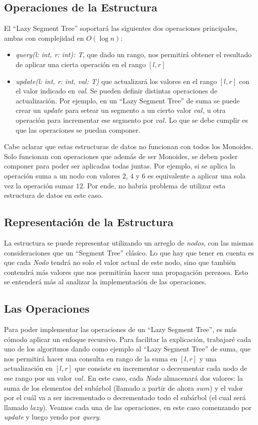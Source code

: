 \documentclass{article}
\begin{document}
\subsection{Operaciones de la Estructura}

El ``Lazy Segment Tree'' soportará las siguientes dos operaciones principales, ambas con complejidad en $O(\log n)$:
\begin{itemize}
    \item \textit{query(l: int, r: int): T}, que dado un rango, nos permitirá obtener el resultado de aplicar una cierta operación en el rango $[l,r]$
    \item  \textit{update(l: int, r: int, val: T)} que actualizará los valores en el rango $[l,r]$ con el valor indicado en \textit{val}. Se pueden definir distintas operaciones de actualización. Por ejemplo, en un ``Lazy Segment Tree'' de suma se puede crear un \textit{update} para setear un segmento a un cierto valor $val$, u otra operación para incrementar ese segmento por $val$. Lo que se debe cumplir es que las operaciones se puedan componer.
\end{itemize}

Cabe aclarar que estas estructuras de datos no funcionan con todos los Monoides. Solo funcionan con operaciones que además de ser Monoides, se deben poder componer para poder ser aplicadas todas juntas. Por ejemplo, si se aplica la operación suma a un nodo con valores $2$, $4$ y $6$ es equivalente a aplicar una sola vez la operación sumar $12$. Por ende, no habría problema de utilizar esta estructura de datos en este caso.

\subsection{Representación de la Estructura}

La estructura se puede representar utilizando un arreglo de \textit{nodos}, con las mismas consideraciones que un ``Segment Tree'' clásico. Lo que hay que tener en cuenta es que cada \textit{Nodo} tendrá no solo el valor actual de este nodo, sino que también contendrá más valores que nos permitirán hacer una propagación perezosa. Esto se entenderá más al analizar la implementación de las operaciones.

\subsection{Las Operaciones}

Para poder implementar las operaciones de un ``Lazy Segment Tree'', es más cómodo aplicar un enfoque recursivo. Para facilitar la explicación, trabajaré cada uno de los algoritmos dando como ejemplo al ``Lazy Segment Tree'' de suma, que nos permitirá hacer una consulta en rango de la suma en $[l,r]$ y una actualización en $[l,r]$ que consiste en incrementar o decrementar cada nodo de ese rango por un valor $val$. En este caso, cada \textit{Nodo} almacenará dos valores: la suma de los elementos del subárbol (llamado a partir de ahora $sum$) y el valor por el cuál va a ser incrementado o decrementado todo el subárbol (el cual será llamado $lazy$). Veamos cada una de las operaciones, en este caso comenzando por \textit{update} y luego yendo por \textit{query}.
\end{document}
